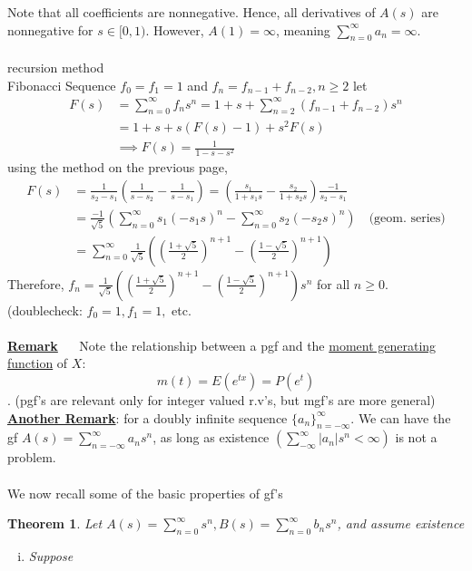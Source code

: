 \documentclass[12pt]{article}
\theoremstyle{definition}
\theoremstyle{plain}
\newtheorem{mythm}{Theorem}[section]
\begin{document}
Note that all coefficients are nonnegative. Hence, all derivatives of $A(s)$ are nonnegative for $s\in [0,1)$. However, $A(1)=\infty$, meaning $\sum_{n=0}^\infty a_n = \infty$.\\ \\
recursion method \\
Fibonacci Sequence $f_0 = f_1 = 1$ and $f_n = f_{n-1} + f_{n-2}, n \geq 2$ let 
\begin{displaymath}
\begin{aligned}
F(s) &= \sum_{n=0}^{\infty} f_n s^n = 1 + s + \sum_{n=2}^\infty (f_{n-1} + f_{n-2})s^n \\
      &= 1 + s + s(F(s) - 1) + s^2F(s)\\
      & \implies F(s) = \frac{1}{1-s-s^2}
\end{aligned}
\end{displaymath}
using the method on the previous page,
\begin{displaymath}
\begin{aligned}
F(s) &= \frac{1}{s_2 - s_1} (\frac{1}{s - s_2} - \frac{1}{s - s_1}) = (\frac{s_1}{1 + s_1 s} - \frac{s_2}{1 + s_2 s})\frac{-1}{s_2 - s_1} \\
&= \frac{-1}{\sqrt{5}}(\sum_{n=0}^\infty s_1 (-s_1 s)^n - \sum_{n=0}^\infty s_2 (-s_2 s)^n) \quad \mbox{(geom. series)} \\
&= \sum_{n=0}^\infty \frac{1}{\sqrt{5}}((\frac{1+\sqrt{5}}{2})^{n+1} - (\frac{1-\sqrt{5}}{2})^{n+1})
\end{aligned}
\end{displaymath}
Therefore, $f_n = \frac{1}{\sqrt{5}}((\frac{1 + \sqrt{5}}{2})^{n+1} - (\frac{1-\sqrt{5}}{2})^{n+1})s^n$ for all $n \geq 0$. (doublecheck: $f_0 = 1, f_1=1,$ etc.\\ \\
\underline{\textbf{Remark}} $\quad$ Note the relationship between a pgf and the \underline{moment generating function} of $X$: \[m(t) = E(e^{tx}) = P(e^t)\]. (pgf's are relevant only for integer valued r.v's, but mgf's are more general) \\
\underline{\textbf{Another Remark}}: for a doubly infinite sequence $\{a_n\}_{n=-\infty}^\infty$. We can have the gf $A(s)=\sum_{n=-\infty}^\infty a_n s^n$, as long as existence $(\sum_{-\infty}^\infty |a_n| s^n < \infty)$ is not a problem. \\ \\
We now recall some of the basic properties of gf's
\begin{mythm}
Let $A(s) = \sum_{n=0}^\infty s^n, B(s) = \sum_{n=0}^\infty b_n s^n$, and assume existence
\begin{enumerate}[(i)]
\item Suppose
\end{enumerate}
\end{mythm}


\clearpage
\end{document}
